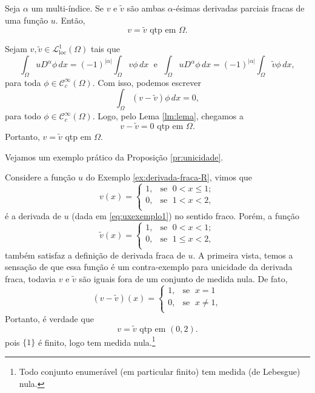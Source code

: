 \documentclass[a4paper, 11pt]{book}
\theoremstyle{definition}
\newcommand{\cC}{\mathcal{C}}
\newcommand{\cL}{\mathcal{L}}
\begin{document}
\begin{pbox} \label{pr:unicidade}
    Seja $\alpha$ um multi-índice. Se $v$ e $\tilde v$ são ambas $\alpha$-ésimas derivadas parciais fracas de uma função $u$.
    Então,
    \[
        v = \tilde v \text{ qtp em } \Omega.
    \]
\end{pbox}
\begin{prf}
    Sejam $v, \tilde v \in \cL^1_{\mathrm{loc}}(\Omega)$ tais que
    \[
        \int_\Omega u D^\alpha \phi \,dx = (-1)^{|\alpha|} \int_\Omega v \phi \,dx \;\text{ e }\; \int_\Omega u D^\alpha \phi \, dx= (-1)^{|\alpha|}\int_\Omega \tilde v \phi \,dx,
    \]
    para toda $\phi \in \cC^\infty_c(\Omega)$. Com isso, podemos escrever
    \[
        \int_\Omega (v - \tilde v) \phi \, dx = 0,
    \]
    para todo $\phi \in \cC^{\infty}_c(\Omega)$.
    Logo, pelo Lema \ref{lm:lema}, chegamos a
    \[
        v - \tilde v = 0 \text{ qtp em } \Omega.
    \]
    Portanto, $v = \tilde v$ qtp em $\Omega$.
\end{prf}

Vejamos um exemplo prático da Proposição \ref{pr:unicidade}.

\begin{ex}
    Considere a função $u$ do Exemplo \ref{ex:derivada-fraca-R}, vimos que
    \[
        v(x) = \left\{
            \begin{array}{rl}
                1, & \!\text{se }\; 0 < x \leqslant 1;\\
                0, & \!\text{se }\; 1 < x < 2,\\
            \end{array}
        \right.
    \]
    é a derivada de $u$ (dada em \ref{eq:uxexemplo1}) no sentido fraco.
    Porém, a função
    \[
        \tilde v(x) = \left\{
            \begin{array}{rl}
                1, & \text{se }\; 0 < x < 1;\\
                0, & \text{se }\; 1 \leqslant x < 2,\\
            \end{array}
        \right.
    \]
    também satisfaz a definição de derivada fraca de $u$.
    A primeira vista, temos a sensação de que essa função é um contra-exemplo para unicidade da derivada fraca, todavia $v$ e $\tilde v$ são iguais fora de um conjunto de medida nula.
    De fato,
    \[
        (v - \tilde v)(x) = \left\{
            \begin{array}{rl}
                1, & \text{se }\; x = 1\\
                0, & \text{se }\; x \neq 1,\\
            \end{array}
        \right.
    \]
    Portanto, é verdade que
    \[
        v = \tilde v \text{ qtp em } (0,2).
    \]
    pois $\{1\}$ é finito, logo tem medida nula.\footnote{Todo conjunto enumerável (em particular finito) tem medida (de Lebesgue) nula.}
\end{ex}
\end{document}
